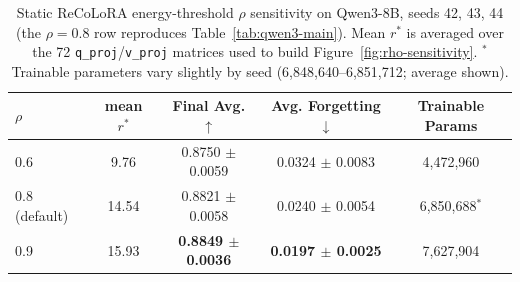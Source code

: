 \documentclass[11pt]{article}
\begin{document}
\begin{table}[t]
\centering
\begin{tabular}{lcccc}
\toprule
$\rho$ & mean $r^*$ & Final Avg. $\uparrow$ & Avg. Forgetting $\downarrow$ & Trainable Params \\
\midrule
0.6 & 9.76 & 0.8750 $\pm$ 0.0059 & 0.0324 $\pm$ 0.0083 & 4,472,960 \\
0.8 (default) & 14.54 & 0.8821 $\pm$ 0.0058 & 0.0240 $\pm$ 0.0054 & 6,850,688$^{*}$ \\
0.9 & 15.93 & \textbf{0.8849 $\pm$ 0.0036} & \textbf{0.0197 $\pm$ 0.0025} & 7,627,904 \\
\bottomrule
\end{tabular}
\caption{Static ReCoLoRA energy-threshold $\rho$ sensitivity on Qwen3-8B, seeds 42, 43, 44 (the $\rho=0.8$ row reproduces Table~\ref{tab:qwen3-main}). Mean $r^*$ is averaged over the 72 \texttt{q\_proj}/\texttt{v\_proj} matrices used to build Figure~\ref{fig:rho-sensitivity}. $^{*}$Trainable parameters vary slightly by seed (6,848,640--6,851,712; average shown).}
\label{tab:qwen3-rho-sensitivity}
\end{table}



\end{document}
